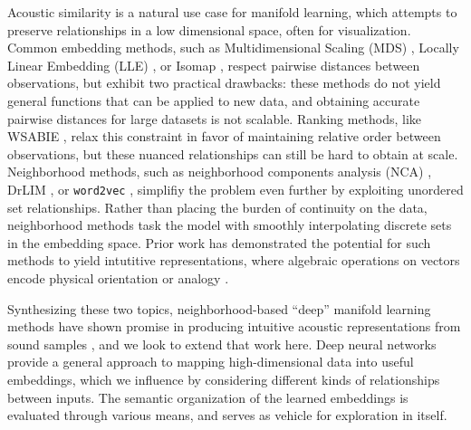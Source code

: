 \documentclass{article}
\begin{document}
Acoustic similarity is a natural use case for manifold learning, which attempts to preserve relationships in a low dimensional space, often for visualization.
Common embedding methods, such as Multidimensional Scaling (MDS) \cite{borg2005mds}, Locally Linear Embedding (LLE) \cite{roweis2000nonlinear}, or Isomap \cite{tenenbaum2000global}, respect pairwise distances between observations, but exhibit two practical drawbacks:
these methods do not yield general functions that can be applied to new data, and obtaining accurate pairwise distances for large datasets is not scalable.
Ranking methods, like WSABIE \cite{weston2011wsabie}, relax this constraint in favor of maintaining relative order between observations, but these nuanced relationships can still be hard to obtain at scale.
Neighborhood methods, such as neighborhood components analysis (NCA) \cite{goldberger2004neighbourhood, salakhutdinov2007learning}, DrLIM \cite{hadsell2006dimensionality}, or \texttt{word2vec} \cite{mikolov2013distributed}, simplifiy the problem even further by exploiting unordered set relationships. %
Rather than placing the burden of continuity on the data, neighborhood methods task the model with smoothly interpolating discrete sets in the embedding space.
Prior work has demonstrated the potential for such methods to yield intutitive representations, where algebraic operations on vectors encode physical orientation \cite{hadsell2006dimensionality} or analogy \cite{mikolov2013efficient}.

Synthesizing these two topics, neighborhood-based ``deep'' manifold learning methods have shown promise in producing intuitive acoustic representations from sound samples \cite{humphrey2011nlse}, and we look to extend that work here.
Deep neural networks provide a general approach to mapping high-dimensional data into useful embeddings, which we influence by considering different kinds of relationships between inputs.
The semantic organization of the learned embeddings is evaluated through various means, and serves as vehicle for exploration in itself.
\end{document}
